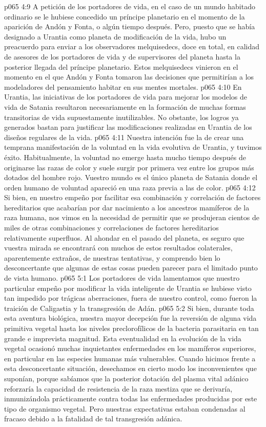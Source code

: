 \vs p065 4:9 A petición de los portadores de vida, en el caso de un mundo habitado ordinario se le hubiese concedido un príncipe planetario en el momento de la aparición de Andón y Fonta, o algún tiempo después. Pero, puesto que se había designado a Urantia como planeta de modificación de la vida, hubo un preacuerdo para enviar a los observadores melquisedecs, doce en total, en calidad de asesores de los portadores de vida y de supervisores del planeta hasta la posterior llegada del príncipe planetario. Estos melquisedecs vinieron en el momento en el que Andón y Fonta tomaron las decisiones que permitirían a los modeladores del pensamiento habitar en sus mentes mortales.
\vs p065 4:10 \pc En Urantia, las iniciativas de los portadores de vida para mejorar los modelos de vida de Satania resultaron necesariamente en la formación de muchas formas transitorias de vida supuestamente inutilizables. No obstante, los logros ya generados bastan para justificar las modificaciones realizadas en Urantia de los diseños regulares de la vida.
\vs p065 4:11 Nuestra intención fue la de crear una temprana manifestación de la voluntad en la vida evolutiva de Urantia, y tuvimos éxito. Habitualmente, la voluntad no emerge hasta mucho tiempo después de originarse las razas de color y suele surgir por primera vez entre los grupos más dotados del hombre rojo. Vuestro mundo es el único planeta de Satania donde el orden humano de voluntad apareció en una raza previa a las de color.
\vs p065 4:12 Si bien, en nuestro empeño por facilitar esa combinación y correlación de factores hereditarios que acabarían por dar nacimiento a los ancestros mamíferos de la raza humana, nos vimos en la necesidad de permitir que se produjeran cientos de miles de otras combinaciones y correlaciones de factores hereditarios relativamente superfluos. Al ahondar en el pasado del planeta, es seguro que vuestra mirada se encontrará con muchos de estos resultados colaterales, aparentemente extraños, de nuestras tentativas, y comprendo bien lo desconcertante que algunas de estas cosas pueden parecer para el limitado punto de vista humano.
\vs p065 5:1 Los portadores de vida lamentamos que nuestro particular empeño por modificar la vida inteligente de Urantia se hubiese visto tan impedido por trágicas aberraciones, fuera de nuestro control, como fueron la traición de Caligastia y la transgresión de Adán.
\vs p065 5:2 Si bien, durante toda esta aventura biológica, nuestra mayor decepción fue la reversión de alguna vida primitiva vegetal hasta los niveles preclorofílicos de la bacteria parasitaria en tan grande e imprevista magnitud. Esta eventualidad en la evolución de la vida vegetal ocasionó muchas inquietantes enfermedades en los mamíferos superiores, en particular en las especies humanas más vulnerables. Cuando hicimos frente a esta desconcertante situación, desechamos en cierto modo los inconvenientes que suponían, porque sabíamos que la posterior dotación del plasma vital adánico reforzaría la capacidad de resistencia de la raza mestiza que se derivaría, inmunizándola prácticamente contra todas las enfermedades producidas por este tipo de organismo vegetal. Pero nuestras expectativas estaban condenadas al fracaso debido a la fatalidad de tal transgresión adánica.

